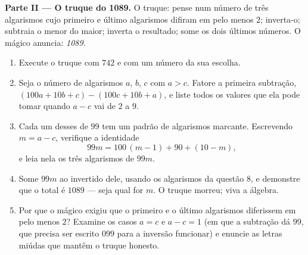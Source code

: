 \begin{problem}
\medskip
\noindent\textbf{Parte II --- O truque do 1089.}
O truque: pense num número de três algarismos cujo primeiro e último
algarismos difiram em pelo menos $2$; inverta-o; subtraia o menor do
maior; inverta o resultado; some os dois últimos números. O mágico
anuncia: \emph{1089}.
\begin{enumerate}[resume]
  \item Execute o truque com $742$ e com um número da sua escolha.
  \item Seja o número de algarismos $a$, $b$, $c$ com $a > c$. Fatore a
        primeira subtração, $(100a + 10b + c) - (100c + 10b + a)$, e
        liste todos os valores que ela pode tomar quando $a - c$ vai de
        $2$ a $9$.
  \item Cada um desses  de $99$ tem um padrão de algarismos
        marcante. Escrevendo $m = a - c$, verifique a identidade
        \[
        99m = 100\,(m - 1) + 90 + (10 - m),
        \]
        e leia nela os três algarismos de $99m$.
  \item Some $99m$ ao invertido dele, usando os algarismos da questão
        8, e demonstre que o total é $1089$ --- seja qual for $m$. O
        truque morreu; viva a álgebra.
  \item Por que o mágico exigiu que o primeiro e o último algarismos
        diferissem em pelo menos $2$? Examine os casos $a = c$ e
        $a - c = 1$ (em que a subtração dá $99$, que precisa ser
        escrito $099$ para a inversão funcionar) e enuncie as letras
        miúdas que mantêm o truque honesto.
\end{enumerate}


\end{problem}
